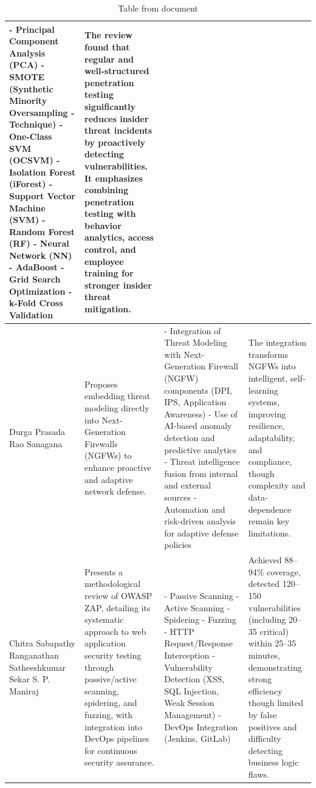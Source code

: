 \documentclass[12pt,a4paper]{report}
\begin{document}
\begin{table}[H]
\begin{tabularx}{\textwidth}{|l|l|l|l|}
- Principal Component Analysis (PCA)
- SMOTE (Synthetic Minority Oversampling - Technique)
- One-Class SVM (OCSVM)
- Isolation Forest (iForest)
- Support Vector Machine (SVM)
- Random Forest (RF)
- Neural Network (NN)
- AdaBoost 
- Grid Search Optimization 
- k-Fold Cross Validation & The review found that regular and well-structured penetration testing significantly reduces insider threat incidents by proactively detecting vulnerabilities. It emphasizes combining penetration testing with behavior analytics, access control, and employee training for stronger insider threat mitigation. \\
\hline
[15] Durga Prasada Rao Sanagana & Proposes embedding threat modeling directly into Next-Generation Firewalls (NGFWs) to enhance proactive and adaptive network defense. & - Integration of Threat Modeling with Next-Generation Firewall (NGFW) components (DPI, IPS, Application Awareness)
- Use of AI-based anomaly detection and predictive analytics
- Threat intelligence fusion from internal and external sources
- Automation and risk-driven analysis for adaptive defense policies & The integration transforms NGFWs into intelligent, self-learning systems, improving resilience, adaptability, and compliance, though complexity and data-dependence remain key limitations. \\
\hline
[16] Chitra Sabapathy Ranganathan  Satheeshkumar Sekar S. P. Maniraj & Presents a methodological review of OWASP ZAP, detailing its systematic approach to web application security testing through passive/active scanning, spidering, and fuzzing, with integration into DevOps pipelines for continuous security assurance. & - Passive Scanning
- Active Scanning
- Spidering
- Fuzzing
- HTTP Request/Response Interception
- Vulnerability Detection (XSS, SQL Injection, Weak Session Management)
- DevOps Integration (Jenkins, GitLab) & Achieved 88–94\% coverage, detected 120–150 vulnerabilities (including 20–35 critical) within 25–35 minutes, demonstrating strong efficiency though limited by false positives and difficulty detecting business logic flaws. \\
\hline
\end{tabularx}
\caption{Table from document}
\end{table}
\end{document}
